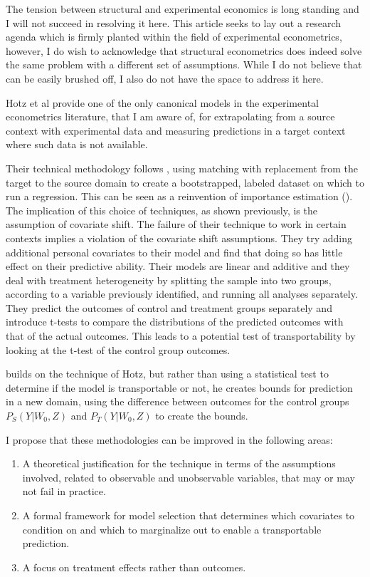 \documentclass[a4paper,12pt]{article}
\begin{document}
The tension between structural and experimental economics is long standing and I will not succeed in resolving it here. This article seeks to lay out a research agenda which is firmly planted within the field of experimental econometrics, however, I do wish to acknowledge that structural econometrics does indeed solve the same problem with a different set of assumptions. While I do not believe that can be easily brushed off, I also do not have the space to address it here.

Hotz et al \parencite*{Hotz2005} provide one of the only canonical models in the experimental econometrics literature, that I am aware of, for extrapolating from a source context with experimental data and measuring predictions in a target context where such data is not available.

Their technical methodology follows \cite{Abadie2006}, using matching with replacement from the target to the source domain to create a bootstrapped, labeled dataset on which to run a regression. This can be seen as a reinvention of importance estimation (\cite{Shimodaira2000, Suigyama2007}). The implication of this choice of techniques, as shown previously, is the assumption of covariate shift. The failure of their technique to work in certain contexts implies a violation of the covariate shift assumptions. They try adding additional personal covariates to their model and find that doing so has little effect on their predictive ability. Their models are linear and additive and they deal with treatment heterogeneity by splitting the sample into two groups, according to a variable previously identified, and running all analyses separately. They predict the outcomes of control and treatment groups separately and introduce t-tests to compare the distributions of the predicted outcomes with that of the actual outcomes. This leads to a potential test of transportability by looking at the t-test of the control group outcomes.

\cite{Gechter2015} builds on the technique of Hotz, but rather than using a statistical test to determine if the model is transportable or not, he creates bounds for prediction in a new domain, using the difference between outcomes for the control groups $P_S(Y|W_0, Z)$ and  $P_T(Y|W_0, Z)$ to create the bounds.

I propose that these methodologies can be improved in the following areas:

\begin{enumerate}
\item A theoretical justification for the technique in terms of the assumptions involved, related to observable and unobservable variables, that may or may not fail in practice.
\item A formal framework for model selection that determines which covariates to condition on and which to marginalize out to enable a transportable prediction.
\item A focus on treatment effects rather than outcomes.
\end{enumerate}
\end{document}
